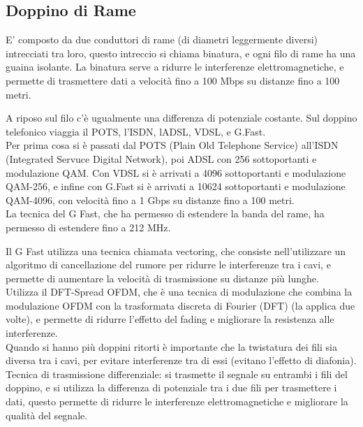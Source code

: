 \subsection{Doppino di Rame}
E' composto da due conduttori di rame (di diametri leggermente diversi) intrecciati tra loro, questo intreccio si chiama binatura, 
e ogni filo di rame ha una guaina isolante. La binatura serve a ridurre le interferenze elettromagnetiche, e permette di trasmettere dati a velocità fino a 100 Mbps su distanze fino a 100 metri.

A riposo sul filo c'è ugualmente una differenza di potenziale costante. Sul doppino telefonico viaggia
il POTS, l'ISDN, lADSL, VDSL, e G.Fast.\\

Per prima cosa si è passati dal POTS (Plain Old Telephone Service) all'ISDN (Integrated Servuce Digital Network), poi ADSL con 256 sottoportanti e modulazione QAM.
Con VDSL si è arrivati a 4096 sottoportanti e modulazione QAM-256, e infine con G.Fast si è arrivati a 10624 sottoportanti e modulazione QAM-4096, con velocità fino a 1 Gbps su distanze fino a 100 metri.\\

La tecnica del G Fast, che ha permesso di estendere la banda del rame, ha permesso di estendere fino a 212 MHz.

Il G Fast utilizza una tecnica chiamata vectoring, che consiste nell'utilizzare un algoritmo di cancellazione del rumore per ridurre 
le interferenze tra i cavi, e permette di aumentare la velocità di trasmissione su distanze più lunghe.\\

Utilizza il DFT-Spread OFDM, che è una tecnica di modulazione che combina la modulazione OFDM con la trasformata discreta di Fourier (DFT) (la applica due volte), e permette di ridurre 
l'effetto del fading e migliorare la resistenza alle interferenze.\\

Quando si hanno più doppini ritorti è importante che la twistatura dei fili sia diversa tra i cavi, per evitare interferenze tra di essi (evitano l'effetto di diafonia).\\

Tecnica di trasmissione differenziale: si trasmette il segnale su entrambi i fili del doppino, e si utilizza la differenza di potenziale tra i due fili per trasmettere i dati, 
questo permette di ridurre le interferenze elettromagnetiche e migliorare la qualità del segnale.\\

